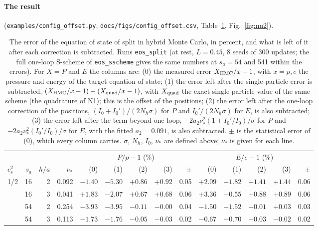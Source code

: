 \documentclass[11pt,aps,preprint,nofootinbib,superscriptaddress,tightenlines]{revtex4-2}
\def\Fig#1{Fig.~\ref{#1}}
\def\Tab#1{Table~\ref{#1}}
\let\oldparagraph\paragraph
\renewcommand{\paragraph}{\par\bigskip\oldparagraph}
\begin{document}
\paragraph{The result} (\nolinkurl{examples/config_offset.py}, \texttt{docs/figs/config\_offset.csv}, \Tab{tab:eoserr}, \Fig{fig:nu2}).
\begin{table}[h]
\caption{The error of the equation of state of split in hybrid Monte Carlo, in percent, and what is left of it after each correction is
subtracted.  Runs \texttt{eos\_split} (at rest, $L=0.45$, 8 seeds of 300 updates; the full one-loop S-scheme of \texttt{eos\_sscheme} gives the same
numbers at $s_a=54$ and 541 within the errors).  For $X=P$ and $E$ the columns are:
(0) the measured error $X_{\rm HMC}/x-1$, with $x=p,e$ the pressure and energy of the target equation of state;
(1) the error left after the single-particle error is subtracted, $(X_{\rm HMC}/x-1)-(X_{\rm quad}/x-1)$, with $X_{\rm quad}$ the exact
single-particle value of the same scheme (the quadrature of N1); this is the offset of the positions;
(2) the error left after the one-loop correction of the positions, $(I_0+I_0')/(2N_h\sigma)$ for $P$ and $I_0'/(2N_h\sigma)$ for $E$, is also
subtracted;
(3) the error left after the term beyond one loop, $-2a_2\nu_*^2(1+I_0'/I_0)/\sigma$ for $P$ and $-2a_2\nu_*^2(I_0'/I_0)/\sigma$ for $E$, with the
fitted $a_2=0.091$, is also subtracted.
$\pm$ is the statistical error of (0), which every column carries.  $\sigma$, $N_h$, $I_0$, $\nu_*$ are defined above; $\nu_*$ is given for each line.}
\label{tab:eoserr}
\begin{center}\small
\begin{tabular}{lrrr|rrrrr|rrrrr}
\toprule
 & & & & \multicolumn{5}{c|}{$P/p-1$ (\%)} & \multicolumn{5}{c}{$E/e-1$ (\%)} \\
$c_s^2$ & $s_a$ & $h/a$ & $\nu_*$ & (0) & (1) & (2) & (3) & $\pm$ & (0) & (1) & (2) & (3) & $\pm$ \\
\midrule
1/2 & 16 & 2 & 0.092 & $-1.40$ & $-5.30$ & $+0.86$ & $+0.92$ & 0.05 & $+2.09$ & $-1.82$ & $+1.41$ & $+1.44$ & 0.06 \\
 & 16 & 3 & 0.041 & $+1.83$ & $-2.07$ & $+0.67$ & $+0.68$ & 0.06 & $+3.36$ & $-0.55$ & $+0.88$ & $+0.89$ & 0.06 \\
 & 54 & 2 & 0.254 & $-3.93$ & $-3.95$ & $-0.11$ & $-0.00$ & 0.04 & $-1.50$ & $-1.52$ & $-0.01$ & $+0.03$ & 0.03 \\
 & 54 & 3 & 0.113 & $-1.73$ & $-1.76$ & $-0.05$ & $-0.03$ & 0.02 & $-0.67$ & $-0.70$ & $-0.03$ & $-0.02$ & 0.02 \\

\end{tabular}
\end{center}
\end{table}
\end{document}
